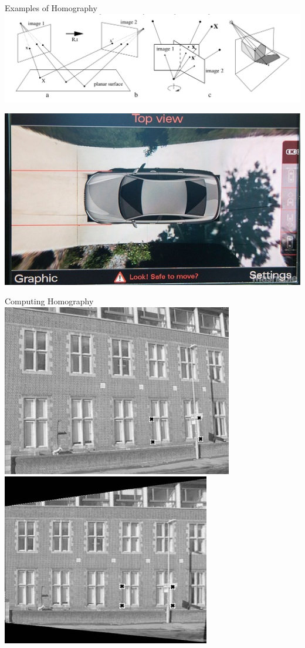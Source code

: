 \documentclass[times,t]{beamer}
\begin{document}
\begin{frame}{Examples  of  Homography}
  \includegraphics[width=\linewidth]{media/examples-of-homography.png}
\end{frame}

\begin{frame}
  \includegraphics[width=0.60\linewidth]{media/audi top view camera.jpg}
\end{frame}

\begin{frame}{Computing Homography}
  \includegraphics[width=0.45\linewidth]{media/removing-perspective-distortion.png}
  \includegraphics[width=0.45\linewidth]{media/removing-perspective-distortion-b.png}
\end{frame}
\end{document}
